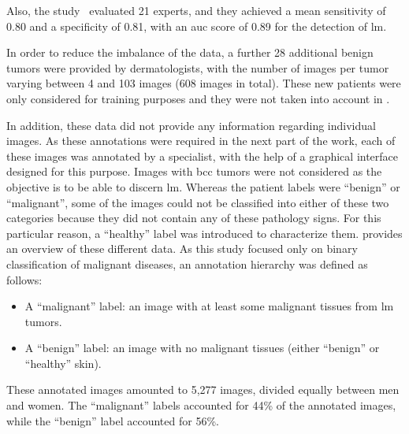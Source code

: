 \documentclass[journal,article,submit,moreauthors,pdftex, applsci]{Definitions/mdpi}
\begin{document}
Also, the study~\cite{Cinotti2018} evaluated 21 experts, and they achieved a mean sensitivity of 0.80 and a specificity of 0.81, with an \ac{auc} score of 0.89 for the detection of \ac{lm}.\par
In order to reduce the imbalance of the data, a further 28 additional benign tumors were provided by dermatologists, with the number of images per tumor varying between 4 and 103 images (608 images in total). These new patients were only considered for training purposes and they were not taken into account in .\par
In addition, these data did not provide any information regarding individual images. As these annotations were required in the next part of the work, each of these images was annotated by a specialist, with the help of a graphical interface designed for this purpose. Images with \ac{bcc} tumors were not considered as the objective is to be able to discern \ac{lm}. Whereas the patient labels were “benign” or “malignant”, some of the images could not be classified into either of these two categories because they did not contain any of these pathology signs. For this particular reason, a “healthy” label was introduced to characterize them.  provides an overview of these different data. As this study focused only on binary classification of malignant diseases, an annotation hierarchy was defined as follows:
\begin{itemize}
\item A “malignant” label: an image with at least some malignant tissues from \ac{lm} tumors.
\item A “benign” label: an image with no malignant tissues (either “benign” or “healthy” skin).
\end{itemize}
These annotated images amounted to 5,277 images, divided equally between men and women. The “malignant” labels accounted for 44\% of the annotated images, while the “benign” label accounted for 56\%.\par

\end{document}
